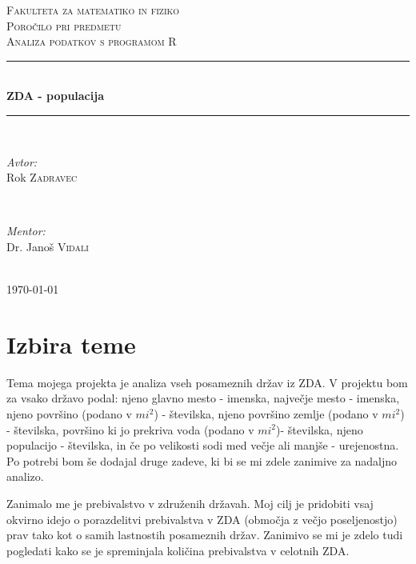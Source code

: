 \documentclass[11pt,a4paper]{article}
\begin{document}
\begin{titlepage}
\newcommand{\HRule}{\rule{\linewidth}{0.5mm}}
\center

\textsc{\LARGE Fakulteta za matematiko in fiziko}\\[3 cm]
\textsc{\Large Poročilo pri predmetu}\\[0.5cm]
\textsc{\large Analiza podatkov s programom R}\\[2 cm]
\HRule \\[0.4cm]
{ \huge \bfseries ZDA - populacija}\\[0.4cm] 
\HRule \\[6 cm]


\begin{minipage}{0.4\textwidth}
\begin{flushleft} \large
\emph{Avtor:}\\
Rok \textsc{Zadravec}
\end{flushleft}
\end{minipage}
~
\begin{minipage}{0.4\textwidth}
\begin{flushright} \large
\emph{Mentor:} \\
Dr. Janoš \textsc{Vidali}
\end{flushright}
\end{minipage}\\[2 cm]

{\large \today}\\[3cm] 


\end{titlepage}

\section{Izbira teme}

Tema mojega projekta je analiza vseh posameznih držav iz ZDA. V projektu bom za vsako državo podal: njeno glavno mesto - imenska, največje mesto - imenska, njeno površino (podano v $mi^2$) - številska, njeno površino zemlje (podano v $mi^2$) - številska, površino ki jo prekriva voda (podano v $mi^2$)- številska, njeno populacijo - številska, in če po velikosti sodi med večje ali manjše - urejenostna. Po potrebi bom še dodajal druge zadeve, ki bi se mi zdele zanimive za nadaljno analizo.

Zanimalo me je prebivalstvo v združenih državah. Moj cilj je pridobiti vsaj okvirno idejo o porazdelitvi prebivalstva v ZDA (območja z večjo poseljenostjo) prav tako kot o samih lastnostih posameznih držav. Zanimivo se mi je zdelo tudi pogledati kako se je spreminjala količina
prebivalstva v celotnih ZDA.
\end{document}
